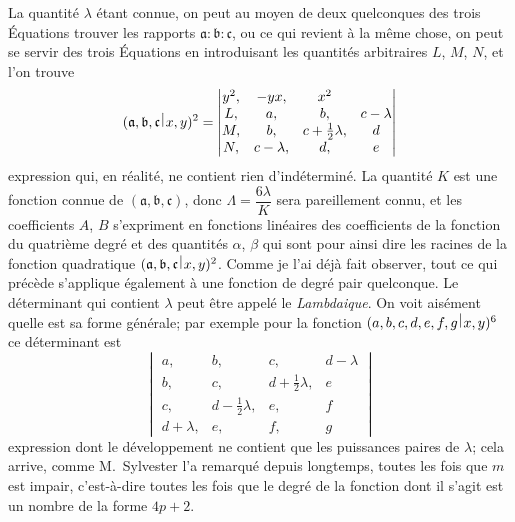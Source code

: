 \documentclass[11pt,a4paper]{book}
\theoremstyle{plain}
\newcommand{\wrule}{\hspace{-0.1em}\mid\hspace{-0.1em}}
\begin{document}
La quantit\'{e} $\lambda$ \'{e}tant connue, on peut au moyen de deux quelconques des trois \'{E}quations trouver les rapports $\mathfrak{a}:\mathfrak{b}:\mathfrak{c}$, ou ce qui revient \`{a} la m\^{e}me chose, on peut se servir des trois \'{E}quations en introduisant les quantit\'{e}s arbitraires $L$, $M$, $N$, et l'on trouve
\[
(\mathfrak{a},\mathfrak{b},\mathfrak{c}\,\raisebox{0.5ex}{$\wrule$}\,x,y)^2=\begin{vmatrix}
y^2, & -yx, & x^2\\
L, & a, & b, & c-\lambda\\
M, & b, & c+\tfrac{1}{2}\lambda, & d\\
N, & c-\lambda, & d, & e
\end{vmatrix}
\]
expression qui, en r\'{e}alit\'{e}, ne contient rien d'ind\'{e}termin\'{e}. La quantit\'{e} $K$ est une fonction connue de $(\mathfrak{a},\mathfrak{b},\mathfrak{c})$, donc $\Lambda=\dfrac{6\lambda}{K}$ sera pareillement connu, et les coefficients $A$, $B$ s'expriment en fonctions lin\'{e}aires des coefficients de la fonction du quatri\`{e}me degr\'{e} et des quantit\'{e}s $\alpha$, $\beta$ qui sont pour ainsi dire les racines de la fonction quadratique $(\mathfrak{a},\mathfrak{b},\mathfrak{c}\,\raisebox{0.5ex}{$\wrule$}\,x,y)^2$. Comme je l'ai d\'{e}j\`{a} fait observer, tout ce qui pr\'{e}c\`{e}de s'applique \'{e}galement \`{a} une fonction de degr\'{e} pair quelconque. Le d\'{e}terminant qui contient $\lambda$ peut \^{e}tre appel\'{e} le \textit{Lambdaique}. On voit ais\'{e}ment quelle est sa forme g\'{e}n\'{e}rale; par exemple pour la fonction $(a,b,c,d,e,f,g\,\raisebox{0.5ex}{$\wrule$}\,x,y)^6$ ce d\'{e}terminant est
\[
\begin{vmatrix}
a, & b, & c, & d-\lambda\\
b, & c, & d+\tfrac{1}{2}\lambda, & e\\
c, & d-\tfrac{1}{2}\lambda, & e, & f\\
d+\lambda, & e, & f, & g
\end{vmatrix}
\]
expression dont le d\'{e}veloppement ne contient que les puissances paires de $\lambda$; cela arrive, comme M.~Sylvester l'a remarqu\'{e} depuis longtemps, toutes les fois que $m$ est impair, c'est-\`{a}-dire toutes les fois que le degr\'{e} de la fonction dont il s'agit est un nombre de la forme $4p+2$.

\newpage

\end{document}
